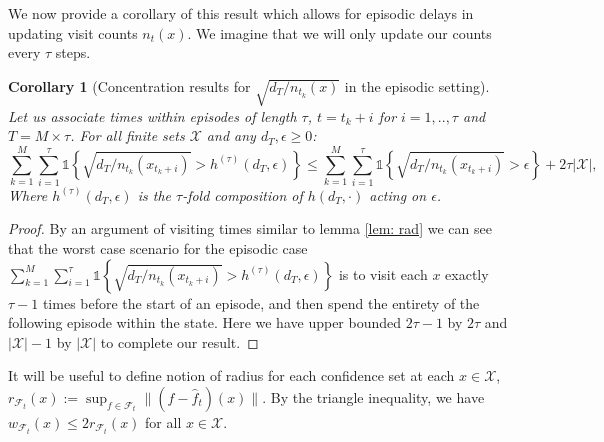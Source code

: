 \documentclass{article}
\newtheorem{corollary}{Corollary}
\newcommand{\Ind}{\mathds{1}}
\newcommand{\Xc}{\mathcal{X}}
\newcommand{\Fc}{\mathcal{F}}
\begin{document}
We now provide a corollary of this result which allows for episodic delays in updating visit counts $n_t(x)$.
We imagine that we will only update our counts every $\tau$ steps.

\begin{corollary}[Concentration results for $\sqrt{d_T / n_{t_k}(x)}$ in the episodic setting]
\label{cor: rad ep} \hspace{0.000000001mm} \newline
Let us associate times within episodes of length $\tau$, $t = t_k+i$ for $i=1,..,\tau$ and $T = M \times \tau$.
For all finite sets $\Xc$ and any $d_T, \epsilon \ge 0$:
$$\sum_{k=1}^M \sum_{i=1}^\tau \Ind \left\{ \sqrt{ d_T / n_{t_k}(x_{t_k+i}) } > h^{(\tau)}(d_T,\epsilon) \right\} \le
	\sum_{k=1}^M \sum_{i=1}^\tau  \Ind \left\{ \sqrt{ d_T / n_{t_k}(x_{t_k+i}) } > \epsilon \right\} + 2\tau |\Xc|,$$
Where $h^{(\tau)}(d_T,\epsilon)$ is the $\tau$-fold composition of $h(d_T,\cdot)$ acting on $\epsilon$.
\end{corollary}
\begin{proof}
By an argument of visiting times similar to lemma \ref{lem: rad} we can see that the worst case scenario for the episodic case $\sum_{k=1}^M \sum_{i=1}^\tau \Ind \left\{ \sqrt{ d_T / n_{t_k}(x_{t_k+i}) } > h^{(\tau)}(d_T,\epsilon) \right\}$ is to visit each $x$ exactly $\tau-1$ times before the start of an episode, and then spend the entirety of the following episode within the state.
Here we have upper bounded $2\tau-1$ by $2\tau$ and $|\Xc|-1$ by $|\Xc|$ to complete our result.
\end{proof}

It will be useful to define notion of radius for each confidence set at each $x \in \Xc$,
$r_{\Fc_t}(x) := \sup_{f \in \Fc_t} \| (f - \hat{f}_t)(x) \|.$
By the triangle inequality, we have $w_{\Fc_t}(x) \le 2 r_{\Fc_t}(x)$ for all $x \in \Xc$.
\end{document}
